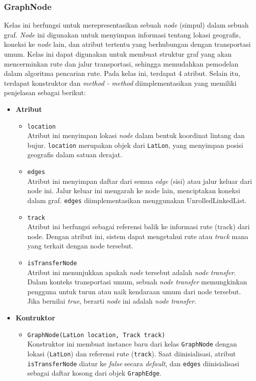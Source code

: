 \subsubsection{GraphNode}
\label{subss:graphnode}
Kelas ini berfungsi untuk merepresentasikan sebuah \textit{node} (simpul) dalam sebuah graf. \textit{Node} ini digunakan untuk menyimpan informasi tentang lokasi geografis, koneksi ke \textit{node} lain, dan atribut tertentu yang berhubungan dengan transportasi umum. Kelas ini dapat digunakan untuk membuat struktur graf yang akan mencerminkan rute dan jalur transportasi, sehingga memudahkan pemodelan dalam algoritma pencarian rute.
Pada kelas ini, terdapat 4 atribut. Selain itu, terdapat konstruktor dan \textit{method - method} diimplementasikan yang memiliki penjelasan sebagai berikut:
\begin{itemize}
    \item \textbf{Atribut}
    \begin{itemize}
        \item \texttt{location}
        \\ Atribut ini menyimpan lokasi \textit{node} dalam bentuk koordinat lintang dan bujur. \texttt{location} merupakan objek dari \texttt{LatLon}, yang menyimpan posisi geografis dalam satuan derajat.
        \item \texttt{edges}
        \\ Atribut ini menyimpan daftar dari semua \textit{edge} (sisi) atau jalur keluar dari node ini. Jalur keluar ini mengarah ke node lain, menciptakan koneksi dalam graf. \texttt{edges} diimplementasikan menggunakan UnrolledLinkedList.
        \item \texttt{track}
        \\ Atribut ini berfungsi sebagai referensi balik ke informasi rute (track) dari node. Dengan atribut ini, sistem dapat mengetahui rute atau \textit{track} mana yang terkait dengan node tersebut.
        \item \texttt{isTransferNode}
        \\ Atribut ini menunjukkan apakah \textit{node} tersebut adalah \textit{node} \textit{transfer}. Dalam konteks transportasi umum, sebuah \textit{node} \textit{transfer} memungkinkan pengguna untuk turun atau naik kendaraan umum dari node tersebut. Jika bernilai \textit{true}, berarti \textit{node} ini adalah \textit{node} \textit{transfer}.
    \end{itemize}

    \item \textbf{Kontruktor}
    \begin{itemize}
        \item \texttt{GraphNode(LatLon location, Track track)}
        \\ Konstruktor ini membuat instance baru dari kelas \texttt{GraphNode} dengan lokasi (\texttt{LatLon}) dan referensi rute (\texttt{track}). Saat diinisialisasi, atribut \texttt{isTransferNode} diatur ke \textit{false} secara \textit{default}, dan \texttt{edges} diinisialisasi sebagai daftar kosong dari objek \texttt{GraphEdge}.
    \end{itemize}


\end{itemize}
